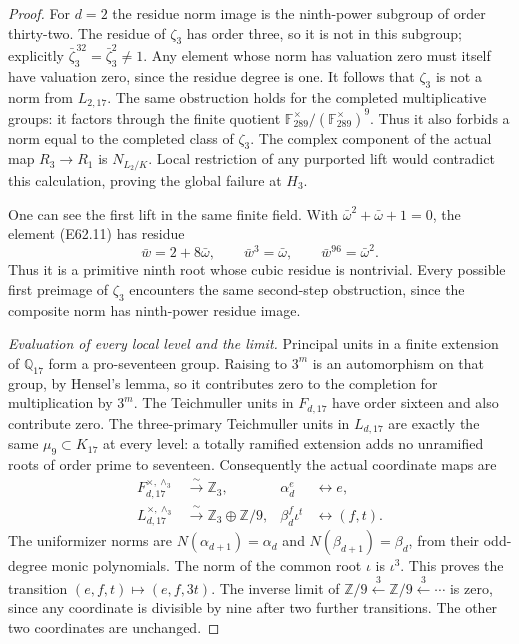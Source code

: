 \begin{proof}
For $d=2$ the residue norm image is the
ninth-power subgroup of order thirty-two.
The residue of $\zeta_3$ has order
three, so it is not in this subgroup;
explicitly
$\bar\zeta_3^{\,32}=\bar\zeta_3^2\ne1$.
Any element whose norm has valuation
zero must itself have valuation zero,
since the residue degree is one.
It follows that $\zeta_3$ is not a norm
from $L_{2,17}$.
The same obstruction holds for the
completed multiplicative groups:
it factors through the finite quotient
$\mathbb F_{289}^{\times}/
(\mathbb F_{289}^{\times})^9$.
Thus it also forbids a norm equal to
the completed class of $\zeta_3$.
The complex component of the actual
map $R_3\to R_1$ is $N_{L_2/K}$.
Local restriction of any purported
lift would contradict this calculation,
proving the global failure at $H_3$.

One can see the first lift in the same
finite field. With
$\bar\omega^2+\bar\omega+1=0$,
the element (E62.11) has residue
\[
       \bar w=2+8\bar\omega,\qquad
       \bar w^3=\bar\omega,\qquad
       \bar w^{96}=\bar\omega^2 .
 \tag{E62.13}
\]
Thus it is a primitive ninth root
whose cubic residue is nontrivial.
Every possible first preimage of
$\zeta_3$ encounters the same
second-step obstruction, since the
composite norm has ninth-power
residue image.

\emph{Evaluation of every local level and the limit.}
Principal units in a finite extension
of $\mathbb Q_{17}$ form a pro-seventeen
group. Raising to $3^m$ is an
automorphism on that group, by Hensel's
lemma, so it contributes zero to the
completion for multiplication by
$3^m$. The Teichmuller units in
$F_{d,17}$ have order sixteen and
also contribute zero. The
three-primary Teichmuller units in
$L_{d,17}$ are exactly the same
$\mu_9\subset K_{17}$ at every level:
a totally ramified extension adds
no unramified roots of order prime
to seventeen.
Consequently the actual coordinate
maps are
\[
 \begin{aligned}
 F_{d,17}^{\times,\wedge_3}
       &\xrightarrow{\ \sim\ }\mathbb Z_3,
              &\alpha_d^e&\longleftrightarrow e,\\
 L_{d,17}^{\times,\wedge_3}
       &\xrightarrow{\ \sim\ }\mathbb Z_3\oplus\mathbb Z/9,
              &\beta_d^f\iota^t&\longleftrightarrow(f,t).
 \end{aligned}
 \tag{E62.14}
\]
The uniformizer norms are
$N(\alpha_{d+1})=\alpha_d$ and
$N(\beta_{d+1})=\beta_d$, from
their odd-degree monic polynomials.
The norm of the common root
$\iota$ is $\iota^3$.
This proves the transition
$(e,f,t)\mapsto(e,f,3t)$.
The inverse limit of
$\mathbb Z/9\xleftarrow{3}
\mathbb Z/9\xleftarrow{3}\cdots$
is zero, since any coordinate is
divisible by nine after two further
transitions. The other two coordinates
are unchanged.


\end{proof}
